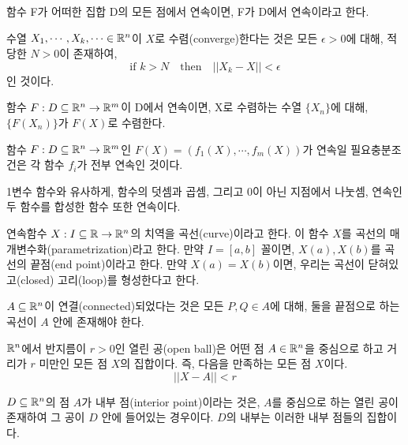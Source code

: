 함수 F가 어떠한 집합 D의 모든 점에서 연속이면, F가 D에서 연속이라고 한다.

\begin{definition}[수열의 수렴]
수열 $X_1, \cdots, X_k, \cdots \in \mathbb{R}^n$이 $X$로 수렴(converge)한다는 것은 모든 $\epsilon >0$에 대해, 적당한 $N > 0$이 존재하여,
$$\text{if } k > N \quad \text{then} \quad ||X_k - X||<\epsilon$$
인 것이다.
\end{definition}

\begin{theorem}
함수 $F: D \subseteq \mathbb{R}^n \to \mathbb{R}^m$이 D에서 연속이면, X로 수렴하는 수열 $\{X_n\}$에 대해, $\{F(X_n)\}$가 $F(X)$로 수렴한다.
\end{theorem}

\begin{theorem}
함수 $F: D \subseteq \mathbb{R}^n \to \mathbb{R}^m$인 $F(X)=(f_1(X),\cdots,f_m(X))$가 연속일 필요충분조건은 각 함수 $f_i$가 전부 연속인 것이다.
\end{theorem}

1변수 함수와 유사하게, 함수의 덧셈과 곱셈, 그리고 0이 아닌 지점에서 나눗셈, 연속인 두 함수를 합성한 함수 또한 연속이다.

\begin{definition}[곡선]
연속함수 $X: I \subseteq \mathbb{R} \to \mathbb{R}^n$의 치역을 곡선(curve)이라고 한다. 이 함수 $X$를 곡선의 매개변수화(parametrization)라고 한다. 만약 $I=[a,b]$ 꼴이면, $X(a), X(b)$를 곡선의 끝점(end point)이라고 한다. 만약 $X(a)=X(b)$이면, 우리는 곡선이 닫혀있고(closed) 고리(loop)를 형성한다고 한다.
\end{definition}

\begin{definition}[연결된 집합]
$A \subseteq \mathbb{R}^n$이 연결(connected)되었다는 것은 모든 $P, Q \in A$에 대해, 둘을 끝점으로 하는 곡선이 $A$ 안에 존재해야 한다.
\end{definition}

\begin{definition}[열린 공]
$\mathbb{R}^n$에서 반지름이 $r>0$인 열린 공(open ball)은 어떤 점 $A \in \mathbb{R}^n$을 중심으로 하고 거리가 $r$ 미만인 모든 점 $X$의 집합이다. 즉, 다음을 만족하는 모든 점 $X$이다.
$$
||X-A||<r
$$
\end{definition}

\begin{definition}[내부 점]
$D \subseteq \mathbb{R}^n$의 점 $A$가 내부 점(interior point)이라는 것은, $A$를 중심으로 하는 열린 공이 존재하여 그 공이 $D$ 안에 들어있는 경우이다. $D$의 내부는 이러한 내부 점들의 집합이다.
\end{definition}

